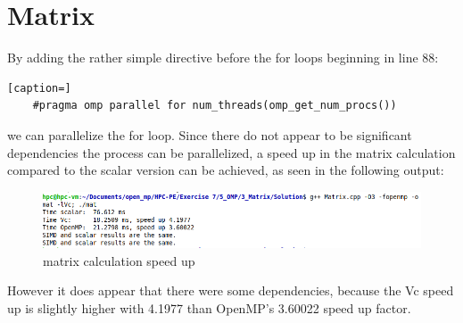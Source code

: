 \documentclass{article}
\begin{document}
\section*{Matrix}
By adding the rather simple directive before the for loops beginning in line 88:
\begin{lstlisting}[caption=]
    #pragma omp parallel for num_threads(omp_get_num_procs())
\end{lstlisting}
we can parallelize the for loop. Since there do not appear to be significant dependencies the process can be parallelized, a speed up in the matrix calculation compared to the scalar version can be achieved, as seen in the following output:
\begin{figure}[H]
    \centering
    \includegraphics[scale=0.6]{matrix_output.png} 
    \caption{matrix calculation speed up}
    \label{fig:graph}
\end{figure}
However it does appear that there were some dependencies, because the Vc speed up is slightly higher with 4.1977 than OpenMP's 3.60022 speed up factor. 
\end{document}
